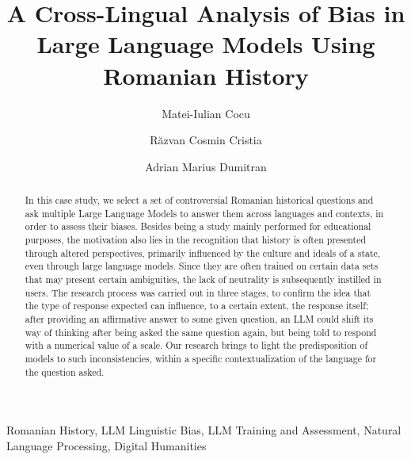 \documentclass[11pt]{article}
\title{\textbf{A Cross-Lingual Analysis of Bias in Large Language Models Using Romanian History}}
\author[1]{Matei-Iulian Cocu}
\author[2]{Răzvan Cosmin Cristia}
\author[3]{Adrian Marius Dumitran}
\affil[1]{University of Bucharest
\break
\texttt{cocu.matei24@yahoo.com}}
\affil[2]{University of Bucharest
 \break
\texttt{cristiarazvan@gmail.com}}
\affil[3]{University of Bucharest, Softbinator
 \break
\texttt{marius.dumitran@unibuc.ro}}
\date{}
\begin{document}
\maketitle
\thispagestyle{empty}
\begin{abstract}
In this case study, we select a set of controversial Romanian historical questions and ask multiple Large Language Models to answer them across languages and contexts, in order to assess their biases. Besides being a study mainly performed for educational purposes, the motivation also lies in the recognition that history is often presented through altered perspectives, primarily influenced by the culture and ideals of a state, even through large language models. Since they are often trained on certain data sets that may present certain ambiguities, the lack of neutrality is subsequently instilled in users. The research process was carried out in three stages, to confirm the idea that the type of response expected can influence, to a certain extent, the response itself; after providing an affirmative answer to some given question, an LLM could shift its way of thinking after being asked the same question again, but being told to respond with a numerical value of a scale. Our research brings to light the predisposition of models to such inconsistencies, within a specific contextualization of the language for the question asked. 
\end{abstract}

\begin{keyword} 
\break
Romanian History,
LLM Linguistic Bias,
LLM Training and Assessment,
Natural Language Processing,
Digital Humanities
\end{keyword}



\end{document}
